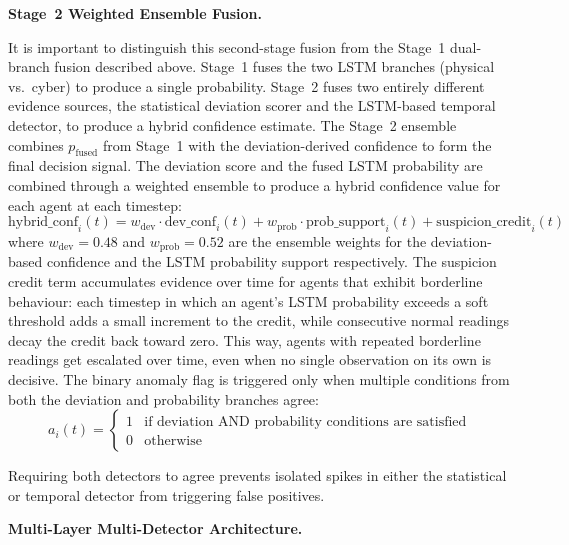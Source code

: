 \par \vspace{0.35cm}
\textbf{Stage~2 Weighted Ensemble Fusion.}

\par \vspace{0.2cm}
It is important to distinguish this second-stage fusion from the Stage~1 dual-branch fusion described above. Stage~1 fuses the two LSTM branches (physical vs.\ cyber) to produce a single probability. Stage~2 fuses two entirely different evidence sources, the statistical deviation scorer and the LSTM-based temporal detector, to produce a hybrid confidence estimate. The Stage~2 ensemble combines $p_{\text{fused}}$ from Stage~1 with the deviation-derived confidence to form the final decision signal. The deviation score and the fused LSTM probability are combined through a weighted ensemble to produce a hybrid confidence value for each agent at each timestep:
\begin{equation}
\text{hybrid\_conf}_{i}(t) = w_{\text{dev}} \cdot \text{dev\_conf}_{i}(t) + w_{\text{prob}} \cdot \text{prob\_support}_{i}(t) + \text{suspicion\_credit}_{i}(t)
\label{eq:hybrid_conf}
\end{equation}
where $w_{\text{dev}} = 0.48$ and $w_{\text{prob}} = 0.52$ are the ensemble weights for the deviation-based confidence and the LSTM probability support respectively. The suspicion credit term accumulates evidence over time for agents that exhibit borderline behaviour: each timestep in which an agent's LSTM probability exceeds a soft threshold adds a small increment to the credit, while consecutive normal readings decay the credit back toward zero. This way, agents with repeated borderline readings get escalated over time, even when no single observation on its own is decisive. The binary anomaly flag is triggered only when multiple conditions from both the deviation and probability branches agree:
\begin{equation}
a_{i}(t) =
\begin{cases}
1 & \text{if deviation AND probability conditions are satisfied} \\
0 & \text{otherwise}
\end{cases}
\label{eq:anomaly_flag}
\end{equation}

Requiring both detectors to agree prevents isolated spikes in either the statistical or temporal detector from triggering false positives.

\par \vspace{0.35cm}
\textbf{Multi-Layer Multi-Detector Architecture.}

